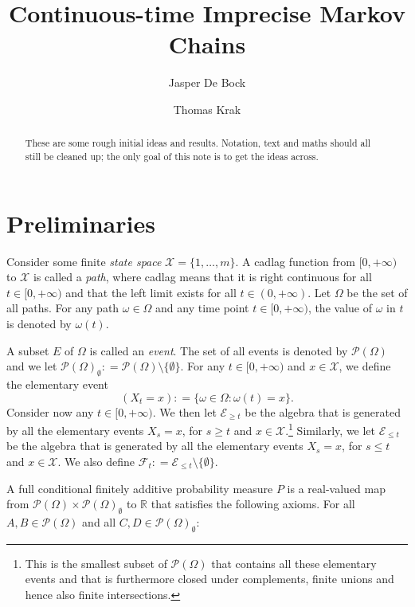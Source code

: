 \documentclass[a4paper,reqno]{amsart}
\newcommand{\reals}{\mathbb{R}}
\newcommand{\states}{\mathcal{X}}
\newcommand{\paths}{\Omega}
\newcommand{\path}{\omega}
\newcommand{\power}{\mathcal{P}(\paths)}
\newcommand{\nonemptypower}{\power_{\emptyset}}
\newcommand{\events}{\mathcal{E}}
\newcommand{\filter}[1][t]{\mathcal{F}_{#1}}
\newcommand{\coloneqq}{:\!=}
\begin{document}
\title{Continuous-time Imprecise Markov Chains}
\author{Jasper De Bock\and Thomas Krak}

\begin{abstract}
These are some rough initial ideas and results. Notation, text and maths should all still be cleaned up; the only goal of this note is to get the ideas across.
\end{abstract}

\maketitle

\section{Preliminaries}

Consider some finite \emph{state space} $\states=\{1,\dots,m\}$. A cadlag function from $[0,+\infty)$ to $\states$ is called a \emph{path}, where cadlag means that it is right continuous for all $t\in[0,+\infty)$ and that the left limit exists for all $t\in(0,+\infty)$. Let $\paths$ be the set of all paths. For any path $\path\in\paths$ and any time point $t\in[0,+\infty)$, the value of $\path$ in $t$ is denoted by $\path(t)$.

A subset $E$ of $\paths$ is called an \emph{event}. The set of all events is denoted by $\power$ and we let $\nonemptypower\coloneqq\power\setminus\{\emptyset\}$. For any $t\in[0,+\infty)$ and $x\in\states$, we define the elementary event
\begin{equation*}
(X_t=x)\coloneqq\{\path\in\paths\colon\path(t)=x\}.
\end{equation*}
Consider now any $t\in[0,+\infty)$. We then let $\events_{\geq t}$ be the algebra that is generated by all the elementary events $X_s=x$, for $s\geq t$ and $x\in\states$.\footnote{This is the smallest subset of $\power$ that contains all these elementary events and that is furthermore closed under complements, finite unions and hence also finite intersections.} Similarly, we let $\events_{\leq t}$ be the algebra that is generated by all the elementary events $X_s=x$, for $s\leq t$ and $x\in\states$. We also define $\filter\coloneqq\events_{\leq t}\setminus\{\emptyset\}$.

A full conditional finitely additive probability measure $P$ is a real-valued map from $\power\times\nonemptypower$ to $\reals$ that satisfies the following axioms. For all $A,B\in\power$ and all \mbox{$C,D\in\nonemptypower$}:
\vspace{5pt}
\end{document}
